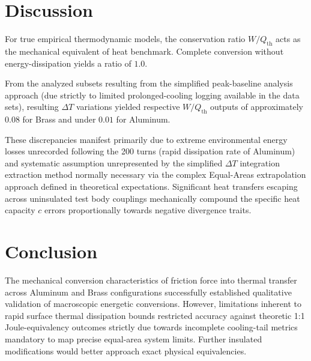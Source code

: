 \documentclass[journal]{IEEEtran}
\begin{document}
\begin{table}[htbp]
    \centering
    \caption{Computed specifics capacities and mechanical equivalent efficiency components per sampled metal.}
    \label{tab:results_summary}
\end{table}

\section{Discussion}
For true empirical thermodynamic models, the conservation ratio $W/Q_{\text{th}}$ acts as the mechanical equivalent of heat benchmark. Complete conversion without energy-dissipation yields a ratio of $1.0$.

From the analyzed subsets resulting from the simplified peak-baseline analysis approach (due strictly to limited prolonged-cooling logging available in the data sets), resulting $\Delta T$ variations yielded respective $W/Q_{\text{th}}$ outputs of approximately $0.08$ for Brass and under $0.01$ for Aluminum.

These discrepancies manifest primarily due to extreme environmental energy losses unrecorded following the 200 turns (rapid dissipation rate of Aluminum) and systematic assumption unrepresented by the simplified $\Delta T$ integration extraction method normally necessary via the complex Equal-Areas extrapolation approach defined in theoretical expectations. Significant heat transfers escaping across uninsulated test body couplings mechanically compound the specific heat capacity $c$ errors proportionally towards negative divergence traits. 

\section{Conclusion}
The mechanical conversion characteristics of friction force into thermal transfer across Aluminum and Brass configurations successfully established qualitative validation of macroscopic energetic conversions. However, limitations inherent to rapid surface thermal dissipation bounds restricted accuracy against theoretic 1:1 Joule-equivalency outcomes strictly due towards incomplete cooling-tail metrics mandatory to map precise equal-area system limits. Further insulated modifications would better approach exact physical equivalencies.
\end{document}
